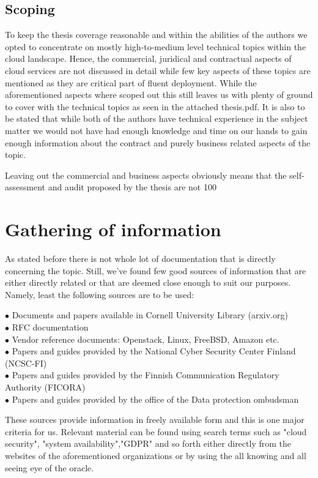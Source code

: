 \documentclass{article}
\begin{document}
\subsection{Scoping}
To keep the thesis coverage reasonable and within the abilities of the authors we opted to concentrate on mostly high-to-medium level technical topics within the cloud landscape.
Hence, the commercial, juridical and contractual aspects of cloud services are not discussed in detail while few key aspects of these topics are mentioned as they are critical part of fluent deployment. While the aforementioned aspects where scoped out this still leaves us with plenty of ground to cover with the technical topics as seen in the attached thesis.pdf.
It is also to be stated that while both of the authors have technical experience in the subject matter we would not have had enough knowledge and time on our hands to gain enough information about the contract and purely business related aspects of the topic.
\par
Leaving out the commercial and business aspects obviously means that the self-assessment and audit proposed by the thesis are not 100%
\section{Gathering of information}
As stated before there is not whole lot of documentation that is directly concerning the topic. Still, we've found few good sources of information that are either directly related or that are deemed close enough to suit our purposes.
Namely, least the following sources are to be used:
\begin{description}
	\item[$\bullet$ Documents and papers available in Cornell University Library (arxiv.org)]
	\item[$\bullet$ RFC documentation]
	\item[$\bullet$ Vendor reference documents: Openstack, Linux, FreeBSD, Amazon etc.]
	\item[$\bullet$ Papers and guides provided by the National Cyber Security Center Finland (NCSC-FI)]
	\item[$\bullet$ Papers and guides provided by the Finnish Communication Regulatory Authority (FICORA)]
	\item[$\bullet$ Papers and guides provided by the office of the Data protection ombudsman]
\end{description}	 
These sources provide information in freely available form and this is one major criteria for us.
Relevant material can be found using search terms such as "cloud security", "system availability","GDPR" and so forth either directly from the websites of the aforementioned organizations or by using the all knowing and all seeing eye of the oracle. 
\end{document}
